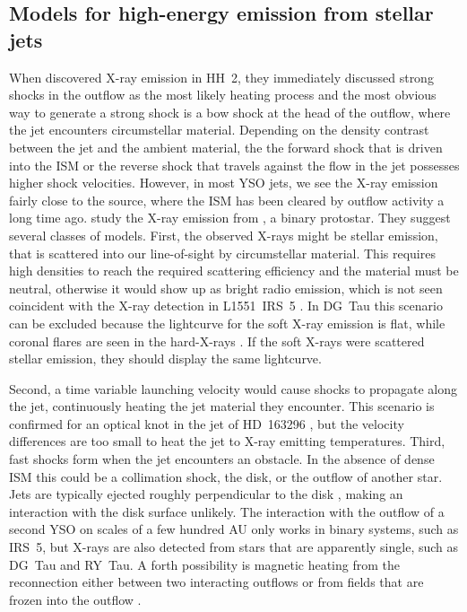 \subsection{Models for high-energy emission from stellar jets}
\label{sect:intromodel}
When \citet{2001Natur.413..708P} discovered X-ray emission in HH~2, they immediately discussed strong shocks in the outflow as the most likely heating process and the most obvious way to generate a strong shock is a bow shock at the head of the outflow, where the jet encounters circumstellar material. Depending on the density contrast between the jet and the ambient material, the the forward shock that is driven into the ISM or the reverse shock that travels against the flow in the jet possesses higher shock velocities. However, in most YSO jets, we see the X-ray emission fairly close to the source, where the ISM has been cleared by outflow activity a long time ago. \citet{2003ApJ...584..843B} study the X-ray emission from , a binary protostar. They suggest several classes of models. First, the observed X-rays might be stellar emission, that is scattered into our line-of-sight by circumstellar material. This requires high densities to reach the required scattering efficiency and the material must be neutral, otherwise it would show up as bright radio emission, which is not seen coincident with the X-ray detection in L1551~IRS~5 \citep{2003ApJ...584..843B}. In DG~Tau this scenario can be excluded because the lightcurve for the soft X-ray emission is flat, while coronal flares are seen in the hard-X-rays \citep{2011ASPC..448..617G}. If the soft X-rays were scattered stellar emission, they should display the same lightcurve.

Second, a time variable launching velocity would cause shocks to propagate along the jet, continuously heating the jet material they encounter. This scenario is confirmed for an optical knot in the jet of HD~163296 \citep{2013A&A...552A.142G}, but the velocity differences are too small to heat the jet to X-ray emitting temperatures. Third, fast shocks form when the jet encounters an obstacle. In the absence of dense ISM this could be a collimation shock, the disk, or the outflow of another star. Jets are typically ejected roughly perpendicular to the disk \citep[e.g.][for IRS 5]{2002A&A...382..573F}, making an interaction with the disk surface unlikely. The interaction with the outflow of a second YSO on scales of a few hundred AU only works in binary systems, such as IRS~5, but X-rays are also detected from stars that are apparently single, such as DG~Tau and RY~Tau. A forth possibility is magnetic heating from the reconnection either between two interacting outflows \citep{2008A&A...478..453M} or from fields that are frozen into the outflow \citep{2013A&A...550L...1S}.

